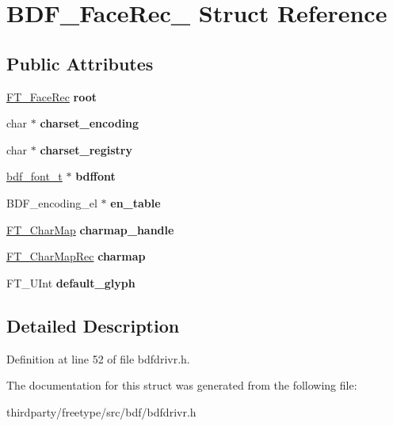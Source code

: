 \hypertarget{struct_b_d_f___face_rec__}{}\section{B\+D\+F\+\_\+\+Face\+Rec\+\_\+ Struct Reference}
\label{struct_b_d_f___face_rec__}
\subsection*{Public Attributes}
\begin{DoxyCompactItemize}
\item 
\mbox{\label{struct_b_d_f___face_rec___a7ab943d1e90a080fabe35fc666a32571}} 
\hyperlink{struct_f_t___face_rec__}{F\+T\+\_\+\+Face\+Rec} {\bfseries root}
\item 
\mbox{\label{struct_b_d_f___face_rec___ae1a370fa10fa83a32e4bc2f34786fed9}} 
char $\ast$ {\bfseries charset\+\_\+encoding}
\item 
\mbox{\label{struct_b_d_f___face_rec___a45cf42c416ab6a8fa58dba439102714b}} 
char $\ast$ {\bfseries charset\+\_\+registry}
\item 
\mbox{\label{struct_b_d_f___face_rec___a7ac32b1e473f46059d30bc47df096f4a}} 
\hyperlink{structbdf__font__t__}{bdf\+\_\+font\+\_\+t} $\ast$ {\bfseries bdffont}
\item 
\mbox{\label{struct_b_d_f___face_rec___a8a0de8b7cdd5690da76636d45835b7fd}} 
B\+D\+F\+\_\+encoding\+\_\+el $\ast$ {\bfseries en\+\_\+table}
\item 
\mbox{\label{struct_b_d_f___face_rec___a495286de738de7d0cc5b9d32a604ea9b}} 
\hyperlink{struct_f_t___char_map_rec__}{F\+T\+\_\+\+Char\+Map} {\bfseries charmap\+\_\+handle}
\item 
\mbox{\label{struct_b_d_f___face_rec___a39f615a95d80abc0304a3e94eda1923f}} 
\hyperlink{struct_f_t___char_map_rec__}{F\+T\+\_\+\+Char\+Map\+Rec} {\bfseries charmap}
\item 
\mbox{\label{struct_b_d_f___face_rec___aec0dd8d657f8de6e8986a376522d53a1}} 
F\+T\+\_\+\+U\+Int {\bfseries default\+\_\+glyph}
\end{DoxyCompactItemize}


\subsection{Detailed Description}


Definition at line 52 of file bdfdrivr.\+h.



The documentation for this struct was generated from the following file\+:\begin{DoxyCompactItemize}
\item 
thirdparty/freetype/src/bdf/bdfdrivr.\+h\end{DoxyCompactItemize}
